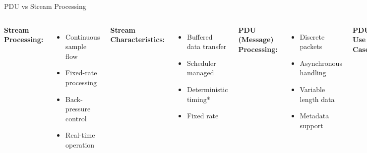 \documentclass[aspectratio=169,11pt]{beamer}
\begin{document}
\begin{frame}{PDU vs Stream Processing}
\begin{columns}
\textbf{Stream Processing:}
\begin{itemize}
    \item Continuous sample flow
    \item Fixed-rate processing
    \item Back-pressure control
    \item Real-time operation
\end{itemize}

\textbf{Stream Characteristics:}
\begin{itemize}
    \item Buffered data transfer
    \item Scheduler managed
    \item Deterministic timing*
    \item Fixed rate
\end{itemize}

\textbf{PDU (Message) Processing:}
\begin{itemize}
    \item Discrete packets
    \item Asynchronous handling
    \item Variable length data
    \item Metadata support
\end{itemize}

\textbf{PDU Use Cases:}
\begin{itemize}
    \item MAC layer protocols
    \item Control messages
    \item Bursty communications
    \item Network packets
    \item Stream to PDU conversion
\end{itemize}
\end{columns}
\end{frame}
\end{document}
